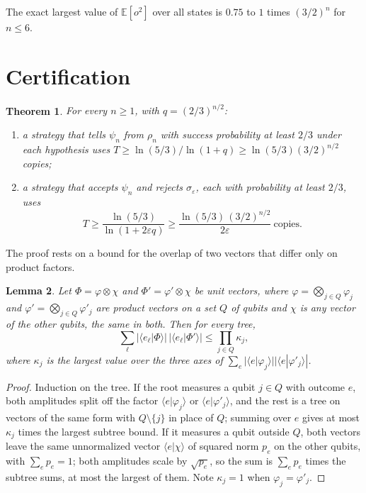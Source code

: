 \documentclass[11pt]{article}
\newtheorem{theorem}{Theorem}
\newtheorem{lemma}[theorem]{Lemma}
\theoremstyle{remark}
\newcommand{\eps}{\varepsilon}
\newcommand{\E}{\mathbb{E}}
\begin{document}
The exact largest value of $\E[o^2]$ over all states is $0.75$ to $1$ times $(3/2)^n$ for $n\le6$.

\section{Certification}\label{sec:cert}

\begin{theorem}\label{thm:cert}
For every $n\ge1$, with $q = (2/3)^{n/2}$:
\begin{enumerate}
\item[(a)] a strategy that tells $\psi_n$ from $\rho_n$ with success probability at least $2/3$ under each hypothesis uses $T\ge\ln(5/3)/\ln(1+q)\ge\ln(5/3)(3/2)^{n/2}$ copies;
\item[(b)] a strategy that accepts $\psi_n$ and rejects $\sigma_\eps$, each with probability at least $2/3$, uses
\[T\ge\frac{\ln(5/3)}{\ln(1+2\eps q)}\ge\frac{\ln(5/3)\,(3/2)^{n/2}}{2\eps}\ \text{copies.}\]
\end{enumerate}
\end{theorem}

The proof rests on a bound for the overlap of two vectors that differ only on product factors.

\begin{lemma}\label{lem:tree}
Let $\Phi = \varphi\otimes\chi$ and $\Phi' = \varphi'\otimes\chi$ be unit vectors, where $\varphi = \bigotimes_{j\in Q}\varphi_j$ and $\varphi' = \bigotimes_{j\in Q}\varphi'_j$ are product vectors on a set $Q$ of qubits and $\chi$ is any vector of the other qubits, the same in both. Then for every tree,
\[
\sum_\ell|\langle e_\ell|\Phi\rangle|\,|\langle e_\ell|\Phi'\rangle|\le\prod_{j\in Q}\kappa_j,
\]
where $\kappa_j$ is the largest value over the three axes of $\sum_e|\langle e|\varphi_j\rangle||\langle e|\varphi'_j\rangle|$.
\end{lemma}

\begin{proof}
Induction on the tree. If the root measures a qubit $j\in Q$ with outcome $e$, both amplitudes split off the factor $\langle e|\varphi_j\rangle$ or $\langle e|\varphi'_j\rangle$, and the rest is a tree on vectors of the same form with $Q\setminus\{j\}$ in place of $Q$; summing over $e$ gives at most $\kappa_j$ times the largest subtree bound. If it measures a qubit outside $Q$, both vectors leave the same unnormalized vector $\langle e|\chi\rangle$ of squared norm $p_e$ on the other qubits, with $\sum_ep_e = 1$; both amplitudes scale by $\sqrt{p_e}$, so the sum is $\sum_ep_e$ times the subtree sums, at most the largest of them. Note $\kappa_j = 1$ when $\varphi_j = \varphi'_j$.
\end{proof}
\end{document}
